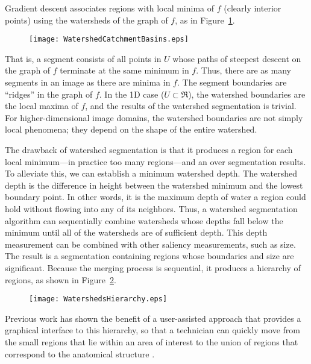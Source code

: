 Gradient descent associates regions with local minima of $f$ (clearly interior
points) using the watersheds of the graph of $f$, as in
Figure~\ref{fig:segment}.
\begin{figure}
\centering
\texttt{[image: WatershedCatchmentBasins.eps]}
\protect\label{fig:segment}
\end{figure}
That is, a segment consists of all points in $U$ whose paths of steepest
descent on the graph of $f$ terminate at the same minimum in $f$.  Thus, there
are as many segments in an image as there are minima in $f$.  The segment
boundaries are ``ridges'' \cite{Koenderink1979,Koenderink1993,Eberly1996} in
the graph of $f$.  In the 1D case ($U \subset \Re$), the watershed boundaries
are the local maxima of $f$, and the results of the watershed segmentation is
trivial.  For higher-dimensional image domains, the watershed boundaries are
not simply local phenomena; they depend on the shape of the entire watershed.

The drawback of watershed segmentation is that it produces a region for each
local minimum---in practice too many regions---and an over segmentation
results.  To alleviate this, we can establish a minimum watershed depth.  The
watershed depth is the difference in height between the watershed minimum and
the lowest boundary point.  In other words, it is the maximum depth of water
a region could hold without flowing into any of its neighbors.  Thus, a
watershed segmentation algorithm can sequentially combine watersheds whose
depths fall below the minimum until all of the watersheds are of sufficient
depth.  This depth measurement can be combined with other saliency
measurements, such as size.  The result is a segmentation containing regions
whose boundaries and size are significant.  Because the merging process is
sequential, it produces a hierarchy of regions, as shown in
Figure~\ref{fig:watersheds}.
\begin{figure}
\centering
\texttt{[image: WatershedsHierarchy.eps]}
\protect\label{fig:watersheds}
\end{figure}
Previous work has shown the benefit of a user-assisted approach that provides
a graphical interface to this hierarchy, so that a technician can quickly move
from the small regions that lie within an area of interest to the union of
regions that correspond to the anatomical structure \cite{Yoo1991}.


